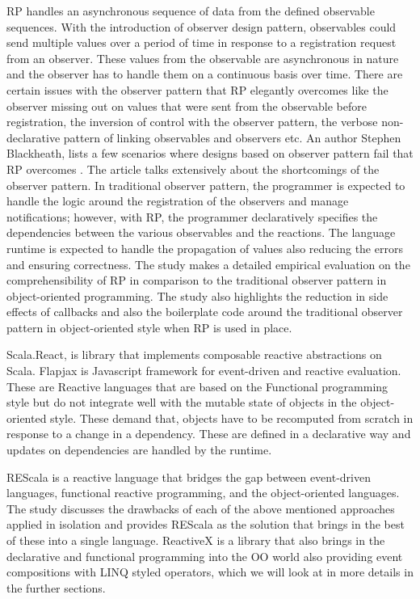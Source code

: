 RP handles an asynchronous sequence of data from the defined observable sequences. 
With the introduction of observer design pattern, observables could send multiple values over a period of time in response to a registration request from an observer. 
These values from the observable are asynchronous in nature and the observer has to handle them on a continuous basis over time. 
There are certain issues with the observer pattern that RP elegantly overcomes like the observer missing out on values that were sent from the observable before registration, the inversion of control with the observer pattern, the verbose non-declarative pattern of linking observables and observers etc. 
An author Stephen Blackheath, lists a few scenarios where designs based on observer pattern fail that RP overcomes \cite{whyFRP}. 
The article\cite{deprecatingTheObserverPattern} talks extensively about the shortcomings of the observer pattern. 
In traditional observer pattern, the programmer is expected to handle the logic around the registration of the observers and manage notifications; however, with RP, the programmer declaratively specifies the dependencies between the various observables and the reactions. 
The language runtime is expected to handle the propagation of values also reducing the errors and ensuring correctness. 
The study\cite{Salvaneschi:2014:ESP:2635868.2635895} makes a detailed empirical evaluation on the comprehensibility of RP in comparison to the traditional observer pattern in object-oriented programming. 
The study also highlights the reduction in side effects of callbacks and also the boilerplate code around the traditional observer pattern in object-oriented style when RP is used in place.

Scala.React\cite{deprecatingTheObserverPattern}, is library that implements composable reactive abstractions on Scala. Flapjax\cite{Meyerovich:2009:FPL:1639949.1640091} is Javascript framework for event-driven and reactive evaluation. These are Reactive languages that are based on the Functional programming style but do not integrate well with the mutable state of objects in the object-oriented style. These demand that, objects have to be recomputed from scratch in response to a change in a dependency. These are defined in a declarative way and updates on dependencies are handled by the runtime.

REScala\cite{Salvaneschi:2014:RBO:2577080.2577083} is a reactive language that bridges the gap between event-driven languages, functional reactive programming, and the object-oriented languages. The study\cite{Salvaneschi:2014:RBO:2577080.2577083} discusses the drawbacks of each of the above mentioned approaches applied in isolation and provides REScala as the solution that brings in the best of these into a single language. ReactiveX\cite{reactiveX} is a library that also brings in the declarative and functional programming into the OO world also providing event compositions with LINQ\cite{linq} styled operators, which we will look at in more details in the further sections.

